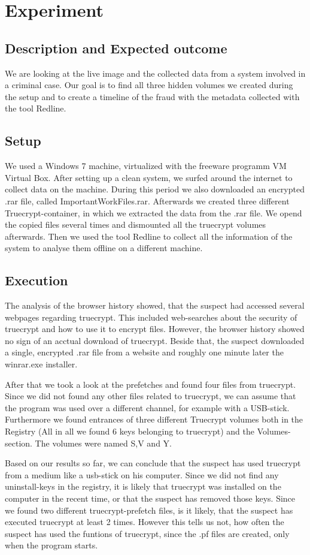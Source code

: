 \section{Experiment}
\subsection{Description and Expected outcome}
We are looking at the live image and the collected data from a system involved in a criminal case. Our goal is to find
all three hidden volumes we created during the setup and to create a timeline of the fraud with the metadata collected with
the tool Redline.

\subsection{Setup}
We used a Windows 7 machine, virtualized with the freeware programm VM Virtual Box. After setting up a clean system, we 
surfed around the internet to collect data on the machine. During this period we also downloaded an encrypted
.rar file, called ImportantWorkFiles.rar. Afterwards we created three different Truecrypt-container, in which we extracted
the data from the .rar file. We opend the copied files several times and dismounted all the truecrypt volumes afterwards.
Then we used the tool Redline to collect all the information of the system to analyse them offline on a different
machine.
\subsection{Execution}
The analysis of the browser history showed, that the suspect had accessed several webpages regarding truecrypt. This included web-searches about the security of truecrypt and how to use it to encrypt files. However, the browser history showed no sign of an acctual download of truecrypt. Beside that, the suspect downloaded a single, encrypted .rar file from a website and roughly one minute later the winrar.exe installer.

After that we took a look at the prefetches and found four files from truecrypt. Since we did not found any other files related to truecrypt, we can assume that the program was used over a different channel, for example with a USB-stick. Furthermore we found entrances of three different Truecrypt volumes both in the Registry (All in all we found 6 keys belonging to truecrypt) and the Volumes-section. The volumes were named S,V and Y.

Based on our results so far, we can conclude that the suspect has used truecrypt from a medium like a usb-stick on his computer. Since we did not find any uninstall-keys in the registry, it is likely that truecrypt was installed on the computer in the recent time, or that the suspect has removed those keys. Since we found two different truecrypt-prefetch files, is it likely, that the suspect has executed truecrypt at least 2 times. However this tells us not, how often the suspect has used the funtions of truecrypt, since the .pf files are created, only when the program starts.

